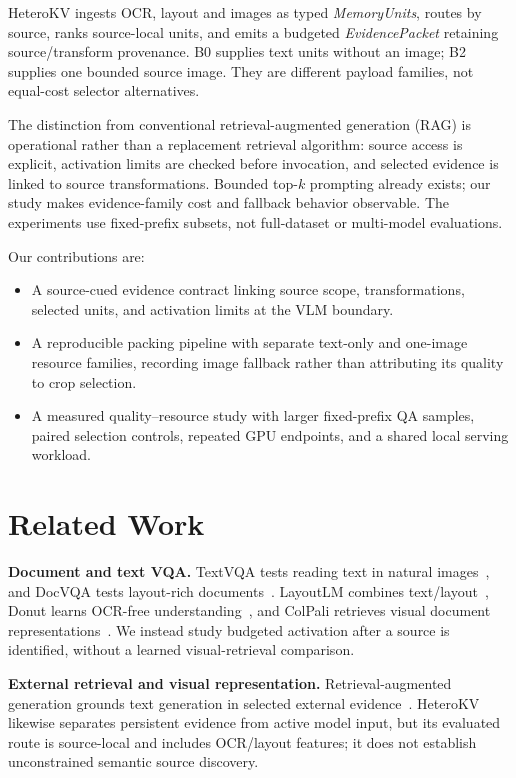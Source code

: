 ﻿\documentclass[conference]{IEEEtran}
\newcommand{\system}{HeteroKV\xspace}
\newcommand{\bzero}{\textsc{B0}\xspace}
\newcommand{\btwo}{\textsc{B2}\xspace}
\begin{document}
\system ingests OCR, layout and images as typed \emph{MemoryUnits}, routes by source, ranks source-local units, and emits a budgeted \emph{EvidencePacket} retaining source/transform provenance. \bzero supplies text units without an image; \btwo supplies one bounded source image. They are different payload families, not equal-cost selector alternatives.

The distinction from conventional retrieval-augmented generation (RAG) is operational rather than a replacement retrieval algorithm: source access is explicit, activation limits are checked before invocation, and selected evidence is linked to source transformations. Bounded top-$k$ prompting already exists; our study makes evidence-family cost and fallback behavior observable. The experiments use fixed-prefix subsets, not full-dataset or multi-model evaluations.

Our contributions are:
\begin{itemize}
  \item A source-cued evidence contract linking source scope, transformations, selected units, and activation limits at the VLM boundary.
  \item A reproducible packing pipeline with separate text-only and one-image resource families, recording image fallback rather than attributing its quality to crop selection.
  \item A measured quality--resource study with larger fixed-prefix QA samples, paired selection controls, repeated GPU endpoints, and a shared local serving workload.
\end{itemize}

\section{Related Work}
\textbf{Document and text VQA.} TextVQA tests reading text in natural images~\cite{singh2019textvqa}, and DocVQA tests layout-rich documents~\cite{mathew2021docvqa}. LayoutLM combines text/layout~\cite{xu2020layoutlm}, Donut learns OCR-free understanding~\cite{kim2022donut}, and ColPali retrieves visual document representations~\cite{faysse2025colpali}. We instead study budgeted activation after a source is identified, without a learned visual-retrieval comparison.

\textbf{External retrieval and visual representation.} Retrieval-augmented generation grounds text generation in selected external evidence~\cite{lewis2020rag}. \system likewise separates persistent evidence from active model input, but its evaluated route is source-local and includes OCR/layout features; it does not establish unconstrained semantic source discovery.
\end{document}
